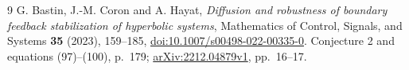 \documentclass[11pt]{article}
\begin{document}
\begin{thebibliography}{9}
 G. Bastin, J.-M. Coron and A. Hayat,
\emph{Diffusion and robustness of boundary feedback stabilization of
hyperbolic systems}, Mathematics of Control, Signals, and Systems
\textbf{35} (2023), 159--185,
\href{https://doi.org/10.1007/s00498-022-00335-0}{doi:10.1007/s00498-022-00335-0}.
Conjecture 2 and equations (97)--(100), p.~179;
\href{https://arxiv.org/abs/2212.04879}{arXiv:2212.04879v1}, pp.~16--17.
\end{thebibliography}
\end{document}

